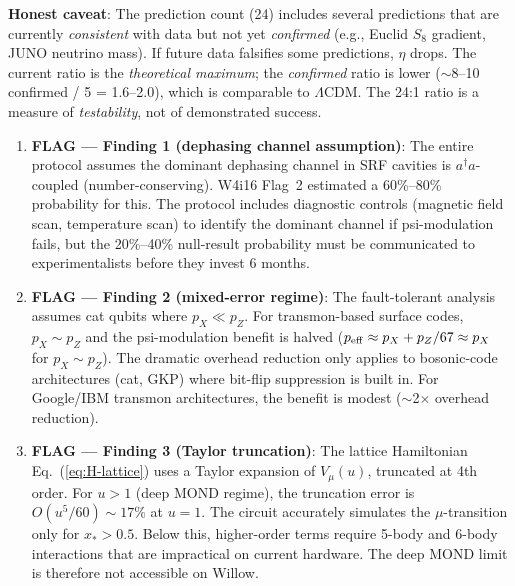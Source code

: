 \documentclass[11pt]{article}
\theoremstyle{definition}
\theoremstyle{remark}
\begin{document}
\begin{tcolorbox}[colback=blue!5!white, colframe=blue!60!black,
  title=\textbf{W4i17 TOP 5 FINDINGS --- READ FIRST}]
\begin{enumerate}[nosep]
  \textbf{Honest caveat}: The prediction count (24) includes several
  predictions that are currently \emph{consistent} with data but not
  yet \emph{confirmed} (e.g., Euclid $S_8$ gradient, JUNO neutrino
  mass). If future data falsifies some predictions, $\eta$ drops.
  The current ratio is the \emph{theoretical maximum}; the
  \emph{confirmed} ratio is lower ($\sim$8--10 confirmed / 5 = 1.6--2.0),
  which is comparable to $\Lambda$CDM. The 24:1 ratio is a measure of
  \emph{testability}, not of demonstrated success.

\end{enumerate}
\end{tcolorbox}

\begin{tcolorbox}[colback=red!5!white, colframe=red!60!black,
  title=\textbf{INCONSISTENCIES AND FLAGS}]
\begin{enumerate}[nosep]

\item \textbf{FLAG --- Finding 1 (dephasing channel assumption)}: The
  entire protocol assumes the dominant dephasing channel in SRF cavities
  is $a^\dagger a$-coupled (number-conserving). W4i16 Flag~2 estimated
  a 60\%--80\% probability for this. The protocol includes diagnostic
  controls (magnetic field scan, temperature scan) to identify the
  dominant channel if psi-modulation fails, but the 20\%--40\% null-result
  probability must be communicated to experimentalists before they invest
  6 months.

\item \textbf{FLAG --- Finding 2 (mixed-error regime)}: The fault-tolerant
  analysis assumes cat qubits where $p_X \ll p_Z$. For transmon-based
  surface codes, $p_X \sim p_Z$ and the psi-modulation benefit is
  halved ($p_{\rm eff} \approx p_X + p_Z/67 \approx p_X$ for
  $p_X \sim p_Z$). The dramatic overhead reduction only applies to
  bosonic-code architectures (cat, GKP) where bit-flip suppression
  is built in. For Google/IBM transmon architectures, the benefit is
  modest ($\sim$2$\times$ overhead reduction).

\item \textbf{FLAG --- Finding 3 (Taylor truncation)}: The lattice
  Hamiltonian Eq.~(\ref{eq:H-lattice}) uses a Taylor expansion of
  $V_\mu(u)$, truncated at 4th order. For $u > 1$ (deep MOND regime),
  the truncation error is $O(u^5/60) \sim 17\%$ at $u = 1$. The
  circuit accurately simulates the $\mu$-transition only for $x_* > 0.5$.
  Below this, higher-order terms require 5-body and 6-body interactions
  that are impractical on current hardware. The deep MOND limit is
  therefore not accessible on Willow.


\end{enumerate}
\end{tcolorbox}
\end{document}
